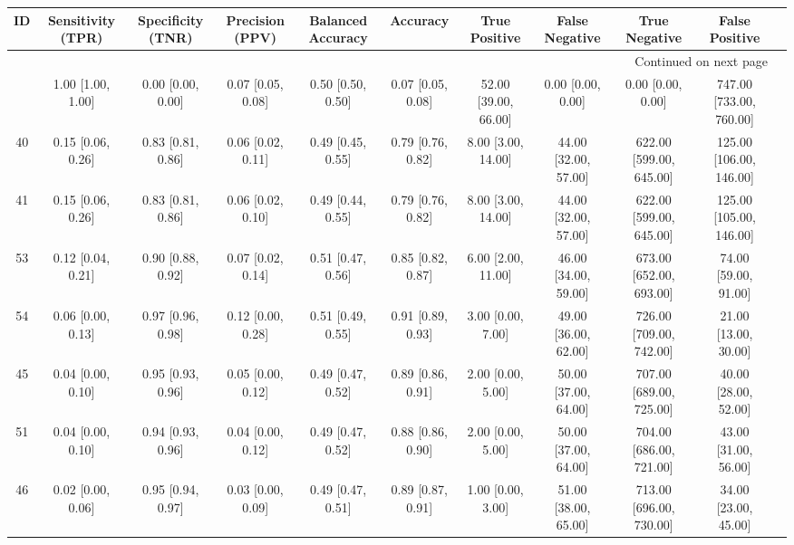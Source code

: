 \documentclass[8pt]{article}
\begin{document}
\begin{center}
\begin{footnotesize}
\begin{longtable}{|ccccccccccc|}
\toprule
 ID &  Sensitivity (TPR) &  Specificity (TNR) &    Precision (PPV) &  Balanced Accuracy &           Accuracy &         True Positive &        False Negative &            True Negative &           False Positive \\
\midrule
\endhead
\midrule
\multicolumn{10}{r}{{Continued on next page}} \\
\midrule
\endfoot

\bottomrule
\endlastfoot
 42 &  1.00 [1.00, 1.00] &  0.00 [0.00, 0.00] &  0.07 [0.05, 0.08] &  0.50 [0.50, 0.50] &  0.07 [0.05, 0.08] &  52.00 [39.00, 66.00] &     0.00 [0.00, 0.00] &        0.00 [0.00, 0.00] &  747.00 [733.00, 760.00] \\
 40 &  0.15 [0.06, 0.26] &  0.83 [0.81, 0.86] &  0.06 [0.02, 0.11] &  0.49 [0.45, 0.55] &  0.79 [0.76, 0.82] &    8.00 [3.00, 14.00] &  44.00 [32.00, 57.00] &  622.00 [599.00, 645.00] &  125.00 [106.00, 146.00] \\
 41 &  0.15 [0.06, 0.26] &  0.83 [0.81, 0.86] &  0.06 [0.02, 0.10] &  0.49 [0.44, 0.55] &  0.79 [0.76, 0.82] &    8.00 [3.00, 14.00] &  44.00 [32.00, 57.00] &  622.00 [599.00, 645.00] &  125.00 [105.00, 146.00] \\
 53 &  0.12 [0.04, 0.21] &  0.90 [0.88, 0.92] &  0.07 [0.02, 0.14] &  0.51 [0.47, 0.56] &  0.85 [0.82, 0.87] &    6.00 [2.00, 11.00] &  46.00 [34.00, 59.00] &  673.00 [652.00, 693.00] &     74.00 [59.00, 91.00] \\
 54 &  0.06 [0.00, 0.13] &  0.97 [0.96, 0.98] &  0.12 [0.00, 0.28] &  0.51 [0.49, 0.55] &  0.91 [0.89, 0.93] &     3.00 [0.00, 7.00] &  49.00 [36.00, 62.00] &  726.00 [709.00, 742.00] &     21.00 [13.00, 30.00] \\
 45 &  0.04 [0.00, 0.10] &  0.95 [0.93, 0.96] &  0.05 [0.00, 0.12] &  0.49 [0.47, 0.52] &  0.89 [0.86, 0.91] &     2.00 [0.00, 5.00] &  50.00 [37.00, 64.00] &  707.00 [689.00, 725.00] &     40.00 [28.00, 52.00] \\
 51 &  0.04 [0.00, 0.10] &  0.94 [0.93, 0.96] &  0.04 [0.00, 0.12] &  0.49 [0.47, 0.52] &  0.88 [0.86, 0.90] &     2.00 [0.00, 5.00] &  50.00 [37.00, 64.00] &  704.00 [686.00, 721.00] &     43.00 [31.00, 56.00] \\
 46 &  0.02 [0.00, 0.06] &  0.95 [0.94, 0.97] &  0.03 [0.00, 0.09] &  0.49 [0.47, 0.51] &  0.89 [0.87, 0.91] &     1.00 [0.00, 3.00] &  51.00 [38.00, 65.00] &  713.00 [696.00, 730.00] &     34.00 [23.00, 45.00] \\

\end{longtable}
\end{footnotesize}
\end{center}
\end{document}
